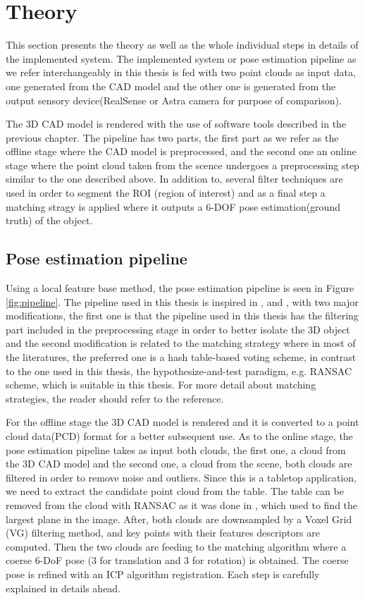 
\chapter{Theory}
\label{chap:theo}
This section presents the theory as well as the whole individual steps in details of the implemented system. The implemented system or pose estimation pipeline as we refer interchangeably in this thesis is fed with two point clouds as input data, one generated from the CAD model and the other one is generated from the output sensory device(RealSense or Astra camera for purpose of comparison).

The 3D CAD model is rendered with the use of software tools described in the previous chapter. The pipeline has two parts, the first part as we refer as the offline stage where the CAD model is preprocessed, and the second one an online stage where the point cloud taken from the scence undergoes a preprocessing step similar to the one described above. In addition to, several filter techniques are used in order to segment the ROI (region of interest) and as a final step a matching stragy is applied where it outputs a 6-DOF pose estimation(ground truth) of the object.  

\section{Pose estimation pipeline}
Using a local feature base method, the pose estimation pipeline is seen in Figure \ref{fig:pipeline}. The pipeline used in this thesis is inspired in \cite{cadPipeline1}, \cite{cadPipeline2} and \cite{cadPipeline3}, with two major modifications, the first one is that the pipeline used in this thesis has the filtering part included in the preprocessing stage in order to better isolate the 3D object and the second modification is related to the matching strategy\cite{repMatching} where in most of the literatures, the preferred one is a hash table-based voting scheme, in contrast to the one used in this thesis, the hypothesize-and-test paradigm\cite{repMatching}, e.g. RANSAC scheme, which is suitable in this thesis. For more detail about matching strategies, the reader should refer to the reference. 

For the offline stage the 3D CAD model is rendered and it is converted to a point cloud data(PCD) format for a better subsequent use. As to the online stage, the pose estimation pipeline takes as input both clouds, the first one, a cloud from the 3D CAD model and the second one, a cloud from the scene, both clouds are filtered in order to remove noise and outliers. Since this is a tabletop application, we need to extract the candidate point cloud from the table. The table can be removed from the cloud with RANSAC as it was done in \cite{cadPipeline3}, which used to find the largest plane in the image. After, both clouds are downsampled by a Voxel Grid (VG) filtering method, and key points with their features descriptors are computed. Then the two clouds are feeding to the matching algorithm where a coerse 6-DoF pose (3 for translation and 3 for rotation) is obtained. The coerse pose is refined with an ICP algorithm registration. Each step is carefully explained in details ahead. 

